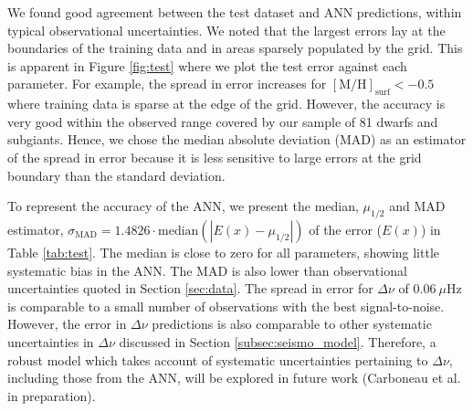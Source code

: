 \documentclass[a4paper,fleqn,usenatbib]{mnras}
\newcommand{\dnu}{\ensuremath{\Delta\nu}}
\newcommand{\metallicity}{\ensuremath{[\mathrm{M}/\mathrm{H}]}}
\begin{document}
We found good agreement between the test dataset and ANN predictions, within typical observational uncertainties. We noted that the largest errors lay at the boundaries of the training data and in areas sparsely populated by the grid. This is apparent in Figure \ref{fig:test} where we plot the test error against each parameter. For example, the spread in error increases for $\metallicity_\mathrm{surf} < -0.5$ where training data is sparse at the edge of the grid. However, the accuracy is very good within the observed range covered by our sample of 81 dwarfs and subgiants. Hence, we chose the median absolute deviation (MAD) as an estimator of the spread in error because it is less sensitive to large errors at the grid boundary than the standard deviation.

To represent the accuracy of the ANN, we present the median, $\mu_{1/2}$ and MAD estimator, $\sigma_\mathrm{MAD} = 1.4826\cdot\mathrm{median}(|E(x) - \mu_{1/2}|)$ of the error ($E(x)$) in Table \ref{tab:test}. The median is close to zero for all parameters, showing little systematic bias in the ANN. The MAD is also lower than observational uncertainties quoted in Section \ref{sec:data}. The spread in error for $\dnu$ of $\SI{0.06}{\mu\Hz}$ is comparable to a small number of observations with the best signal-to-noise. However, the error in $\dnu$ predictions is also comparable to other systematic uncertainties in $\dnu$ discussed in Section \ref{subsec:seismo_model}. Therefore, a robust model which takes account of systematic uncertainties pertaining to $\dnu$, including those from the ANN, will be explored in future work (Carboneau et al. in preparation).
\end{document}
